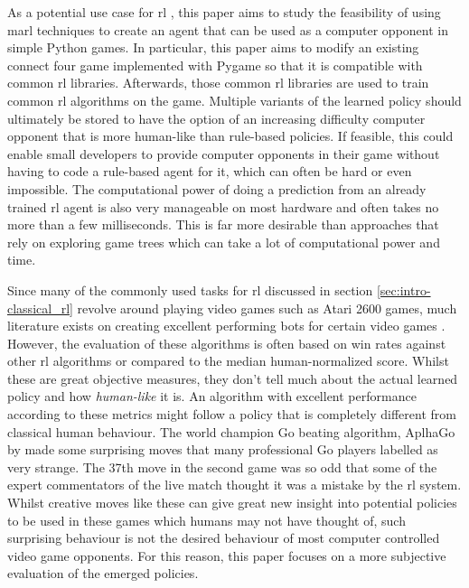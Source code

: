 As a potential use case for \gls{rl} , this paper aims to study the feasibility of using \gls{marl} techniques to create an agent that can be used as a computer opponent in simple Python games.
In particular, this paper aims to modify an existing connect four game implemented with Pygame so that it is compatible with common \gls{rl} libraries.
Afterwards, those common \gls{rl} libraries are used to train common \gls{rl} algorithms on the game.
Multiple variants of the learned policy should ultimately be stored to have the option of an increasing difficulty computer opponent that is more human-like than rule-based policies.
If feasible, this could enable small developers to provide computer opponents in their game without having to code a rule-based agent for it, which can often be hard or even impossible.
The computational power of doing a prediction from an already trained \gls{rl} agent is also very manageable on most hardware and often takes no more than a few milliseconds.
This is far more desirable than approaches that rely on exploring game trees which can take a lot of computational power and time.

Since many of the commonly used tasks for \gls{rl} discussed in section \ref{sec:intro-classical_rl} revolve around playing video games such as Atari 2600 games, much literature exists on creating excellent performing bots for certain video games \citep{rainbow, dqn, efficient_zero, selfplay3, videogame_rl}.
However, the evaluation of these algorithms is often based on win rates against other \gls{rl} algorithms or compared to the median human-normalized score.
Whilst these are great objective measures, they don't tell much about the actual learned policy and how \textit{human-like} it is.
An algorithm with excellent performance according to these metrics might follow a policy that is completely different from classical human behaviour.
The world champion Go beating algorithm, AplhaGo by \citet{alphago} made some surprising moves that many professional Go players labelled as very strange.
The 37th move in the second game was so odd that some of the expert commentators of the live match thought it was a mistake by the \gls{rl} system.
Whilst creative moves like these can give great new insight into potential policies to be used in these games which humans may not have thought of, such surprising behaviour is not the desired behaviour of most computer controlled video game opponents.
For this reason, this paper focuses on a more subjective evaluation of the emerged policies.


